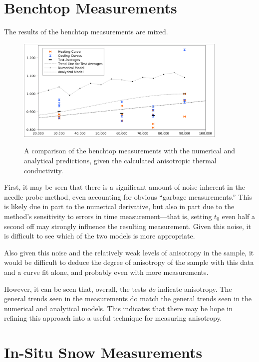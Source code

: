 \section{Benchtop Measurements}

The results of the benchtop measurements are mixed.

\begin{figure}[h]
\centering
\includegraphics[width=0.9\textwidth]{fig/test_results.png}
\label{fig:test_results}
\caption{A comparison of the benchtop measurements with the numerical and
analytical predictions, given the calculated anisotropic thermal conductivity.}
\end{figure}

First, it may be seen that there is a significant amount of noise inherent in
the needle probe method, even accounting for obvious ``garbage measurements.''
This is likely due in part to the numerical derivative, but also in part due to
the method's sensitivity to errors in time measurement---that is, setting \(t_0\)
even half a second off may strongly influence the resulting measurement. Given
this noise, it is difficult to see which of the two models is more appropriate.


Also given this noise and the relatively weak levels of anisotropy in the
sample, it would be difficult to deduce the degree of anisotropy of the sample
with this data and a curve fit alone, and probably even with more measurements.

However, it can be seen that, overall, the tests \emph{do} indicate anisotropy.
The general trends seen in the measurements do match the general trends seen in
the numerical and analytical models. This indicates that there may be hope in
refining this approach into a useful technique for measuring anisotropy.

\section{In-Situ Snow Measurements}

